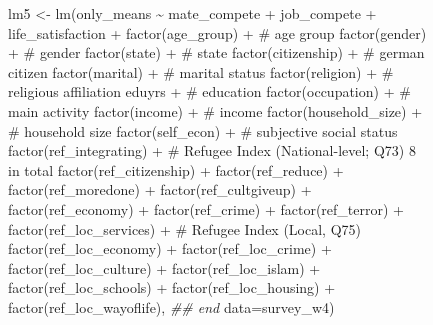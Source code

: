 \documentclass[
]{article}
\newenvironment{Shaded}{\begin{snugshade}}{\end{snugshade}}
\newcommand{\AttributeTok}[1]{\textcolor[rgb]{0.40,0.45,0.13}{#1}}
\newcommand{\CommentTok}[1]{\textcolor[rgb]{0.37,0.37,0.37}{#1}}
\newcommand{\DocumentationTok}[1]{\textcolor[rgb]{0.37,0.37,0.37}{\textit{#1}}}
\newcommand{\FunctionTok}[1]{\textcolor[rgb]{0.28,0.35,0.67}{#1}}
\newcommand{\NormalTok}[1]{\textcolor[rgb]{0.00,0.23,0.31}{#1}}
\newcommand{\OtherTok}[1]{\textcolor[rgb]{0.00,0.23,0.31}{#1}}
\newcommand{\SpecialCharTok}[1]{\textcolor[rgb]{0.37,0.37,0.37}{#1}}
\begin{document}
\begin{figure}
\begin{table}
\begin{minipage}[t]{\linewidth}
{\begin{Shaded}
\begin{Highlighting}[]
\NormalTok{lm5 }\OtherTok{\textless{}{-}} \FunctionTok{lm}\NormalTok{(only\_means }\SpecialCharTok{\textasciitilde{}}\NormalTok{ mate\_compete }\SpecialCharTok{+}\NormalTok{ job\_compete }\SpecialCharTok{+}\NormalTok{ life\_satisfaction }\SpecialCharTok{+} 
            \FunctionTok{factor}\NormalTok{(age\_group) }\SpecialCharTok{+}      \CommentTok{\# age group}
            \FunctionTok{factor}\NormalTok{(gender) }\SpecialCharTok{+}      \CommentTok{\# gender }
            \FunctionTok{factor}\NormalTok{(state) }\SpecialCharTok{+}      \CommentTok{\# state  }
            \FunctionTok{factor}\NormalTok{(citizenship) }\SpecialCharTok{+}     \CommentTok{\# german citizen}
            \FunctionTok{factor}\NormalTok{(marital) }\SpecialCharTok{+}     \CommentTok{\# marital status}
            \FunctionTok{factor}\NormalTok{(religion) }\SpecialCharTok{+}     \CommentTok{\# religious affiliation}
\NormalTok{            eduyrs }\SpecialCharTok{+} \CommentTok{\# education}
            \FunctionTok{factor}\NormalTok{(occupation) }\SpecialCharTok{+}     \CommentTok{\# main activity}
            \FunctionTok{factor}\NormalTok{(income) }\SpecialCharTok{+}    \CommentTok{\# income}
            \FunctionTok{factor}\NormalTok{(household\_size) }\SpecialCharTok{+}    \CommentTok{\# household size}
            \FunctionTok{factor}\NormalTok{(self\_econ) }\SpecialCharTok{+}    \CommentTok{\# subjective social status}
            \FunctionTok{factor}\NormalTok{(ref\_integrating) }\SpecialCharTok{+} \CommentTok{\# Refugee Index (National{-}level; Q73) 8 in total}
            \FunctionTok{factor}\NormalTok{(ref\_citizenship) }\SpecialCharTok{+} \FunctionTok{factor}\NormalTok{(ref\_reduce) }\SpecialCharTok{+} \FunctionTok{factor}\NormalTok{(ref\_moredone) }\SpecialCharTok{+} \FunctionTok{factor}\NormalTok{(ref\_cultgiveup) }\SpecialCharTok{+} 
            \FunctionTok{factor}\NormalTok{(ref\_economy) }\SpecialCharTok{+} \FunctionTok{factor}\NormalTok{(ref\_crime) }\SpecialCharTok{+} \FunctionTok{factor}\NormalTok{(ref\_terror) }\SpecialCharTok{+} 
            \FunctionTok{factor}\NormalTok{(ref\_loc\_services) }\SpecialCharTok{+}    \CommentTok{\# Refugee Index (Local, Q75)}
            \FunctionTok{factor}\NormalTok{(ref\_loc\_economy) }\SpecialCharTok{+} \FunctionTok{factor}\NormalTok{(ref\_loc\_crime) }\SpecialCharTok{+} \FunctionTok{factor}\NormalTok{(ref\_loc\_culture) }\SpecialCharTok{+} \FunctionTok{factor}\NormalTok{(ref\_loc\_islam) }\SpecialCharTok{+} 
            \FunctionTok{factor}\NormalTok{(ref\_loc\_schools) }\SpecialCharTok{+} \FunctionTok{factor}\NormalTok{(ref\_loc\_housing) }\SpecialCharTok{+} \FunctionTok{factor}\NormalTok{(ref\_loc\_wayoflife), }\DocumentationTok{\#\# end}
          \AttributeTok{data=}\NormalTok{survey\_w4)}



\end{Highlighting}
\end{Shaded}}
\end{minipage}
\end{table}
\end{figure}
\end{document}
